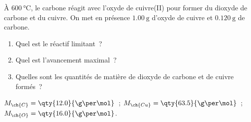 À $\qty{600}{\degreeCelsius}$, le carbone réagit avec l'oxyde de cuivre(II)
 pour former du dioxyde de carbone et du cuivre. On met en présence
$\qty{1.00}{\g}$ d'oxyde de cuivre et $\qty{0.120}{\g}$ de carbone.
\begin{enumerate}
    \item Quel est le réactif limitant~?
    \item Quel est l'avancement maximal~?
    \item Quelles sont les quantités de matière de dioxyde de carbone et de
          cuivre formés~?
\end{enumerate}
\begin{donnees}
    $M_{\ch{C}}=\qty{12.0}{\g\per\mol}$~;
    $M_{\ch{Cu}}=\qty{63.5}{\g\per\mol}$~;
    $M_{\ch{O}}=\qty{16.0}{\g\per\mol}$.
\end{donnees}


